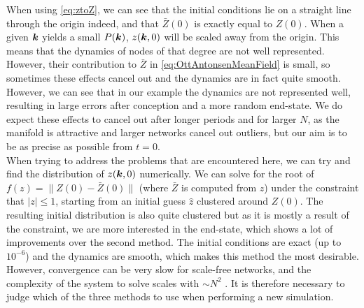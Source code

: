 When using \eqref{eq:ztoZ}, we can see that the initial conditions lie on a straight line through the origin indeed, and that $\bar{Z}(0)$ is exactly equal to $Z(0)$. When a given ${\boldsymbol{k}}$ yields a small $P({\boldsymbol{k}})$, $z({\boldsymbol{k}},0)$ will be scaled away from the origin. This means that the dynamics of nodes of that degree are not well represented. However, their contribution to $\bar{Z}$ in \eqref{eq:OttAntonsenMeanField} is small, so sometimes these effects cancel out and the dynamics are in fact quite smooth. However, we can see that in our example the dynamics are not represented well, resulting in large errors after conception and a more random end-state. We do expect these effects to cancel out after longer periods and for larger $N$, as the manifold is attractive and larger networks cancel out outliers, but our aim is to be as precise as possible from $t=0$. \\

When trying to address the problems that are encountered here, we can try and find the distribution of $z({\boldsymbol{k}},0)$ numerically. We can solve for the root of $f(z) = \| Z(0) - \bar{Z}(0) \|$ (where $\bar{Z}$ is computed from $z$) under the constraint that $| z | \leq 1$, starting from an initial guess $\hat{z}$ clustered around $Z(0)$. The resulting initial distribution is also quite clustered but as it is mostly a result of the constraint, we are more interested in the end-state, which shows a lot of improvements over the second method. The initial conditions are exact (up to $10^{-6}$) and the dynamics are smooth, which makes this method the most desirable. However, convergence can be very slow for scale-free networks, and the complexity of the system to solve scales with $\sim N^2$ . It is therefore necessary to judge which of the three methods to use when performing a new simulation.


